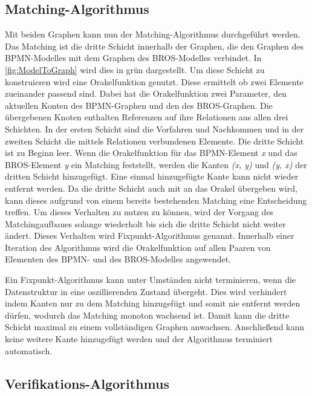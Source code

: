 \subsection*{Matching-Algorithmus}

Mit beiden Graphen kann nun der Matching-Algorithmus durchgeführt werden.
Das Matching ist die dritte Schicht innerhalb der Graphen, die den Graphen des BPMN-Modelles mit dem Graphen des BROS-Modelles verbindet.
In \cref{fig:ModelToGraph} wird dies in grün dargestellt.
Um diese Schicht zu konstruieren wird eine Orakelfunktion genutzt.
Diese ermittelt ob zwei Elemente zueinander passend sind.
Dabei hat die Orakelfunktion zwei Parameter, den aktuellen Konten des BPMN-Graphen und den des BROS-Graphen.
Die übergebenen Knoten enthalten Referenzen auf ihre Relationen aus allen drei Schichten.
In der ersten Schicht sind die Vorfahren und Nachkommen und in der zweiten Schicht die mittels Relationen verbundenen Elemente.
Die dritte Schicht ist zu Beginn leer.
Wenn die Orakelfunktion für das BPMN-Element \emph{x} und das BROS-Element \emph{y} ein Matching feststellt, werden die Kanten \emph{(x, y)} und \emph{(y, x)} der dritten Schicht hinzugefügt.
Eine einmal hinzugefügte Kante kann nicht wieder entfernt werden.
Da die dritte Schicht auch mit an das Orakel übergeben wird, kann dieses aufgrund von einem bereits bestehenden Matching eine Entscheidung treffen.
Um dieses Verhalten zu nutzen zu können, wird der Vorgang des Matchingaufbaues solange wiederholt bis sich die dritte Schicht nicht weiter ändert.
Dieses Verhalten wird Fixpunkt-Algorithmus genannt.
Innerhalb einer Iteration des Algorithmus wird die Orakelfunktion auf allen Paaren von Elementen des BPMN- und des BROS-Modelles angewendet.

Ein Fixpunkt-Algorithmus kann unter Umständen nicht terminieren, wenn die Datenstruktur in eine oszillierenden Zustand übergeht.
Dies wird verhindert indem Kanten nur zu dem Matching hinzugefügt und somit nie entfernt werden dürfen, wodurch das Matching monoton wachsend ist.
Damit kann die dritte Schicht maximal zu einem vollständigen Graphen anwachsen.
Anschließend kann keine weitere Kante hinzugefügt werden und der Algorithmus terminiert automatisch.

\subsection*{Verifikations-Algorithmus}

